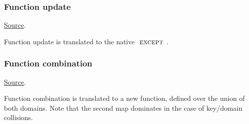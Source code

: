 \subsubsection{ Function update}
\href{https://github.com/saltiniroberto/ssf/blob/7ea6e18093d9da3154b4e396dd435549f687e6b9/high_level/common/pythonic_code_generic.py#L113-L114}{Source}.



\begin{mathpar}
\end{mathpar}
Function update is translated to the \tlap{} native $\EXCEPT$.

\subsubsection{ Function combination}
\href{https://github.com/saltiniroberto/ssf/blob/7ea6e18093d9da3154b4e396dd435549f687e6b9/high_level/common/pythonic_code_generic.py#L117-L118}{Source}.



\begin{mathpar}
\end{mathpar}
Function combination is translated to a new function, defined over the union of both domains. Note that the second map dominates in the case of key/domain collisions.



